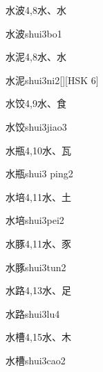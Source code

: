 \begin{Entry}{水波}{4,8}{⽔、⽔}
  \begin{Phonetics}{水波}{shui3bo1}
  \end{Phonetics}
\end{Entry}

\begin{Entry}{水泥}{4,8}{⽔、⽔}
  \begin{Phonetics}{水泥}{shui3ni2}[][HSK 6]
  \end{Phonetics}
\end{Entry}

\begin{Entry}{水饺}{4,9}{⽔、⾷}
  \begin{Phonetics}{水饺}{shui3jiao3}
  \end{Phonetics}
\end{Entry}

\begin{Entry}{水瓶}{4,10}{⽔、⽡}
  \begin{Phonetics}{水瓶}{shui3 ping2}
  \end{Phonetics}
\end{Entry}

\begin{Entry}{水培}{4,11}{⽔、⼟}
  \begin{Phonetics}{水培}{shui3pei2}
  \end{Phonetics}
\end{Entry}

\begin{Entry}{水豚}{4,11}{⽔、⾗}
  \begin{Phonetics}{水豚}{shui3tun2}
  \end{Phonetics}
\end{Entry}

\begin{Entry}{水路}{4,13}{⽔、⾜}
  \begin{Phonetics}{水路}{shui3lu4}
  \end{Phonetics}
\end{Entry}

\begin{Entry}{水槽}{4,15}{⽔、⽊}
  \begin{Phonetics}{水槽}{shui3cao2}
  \end{Phonetics}
\end{Entry}

